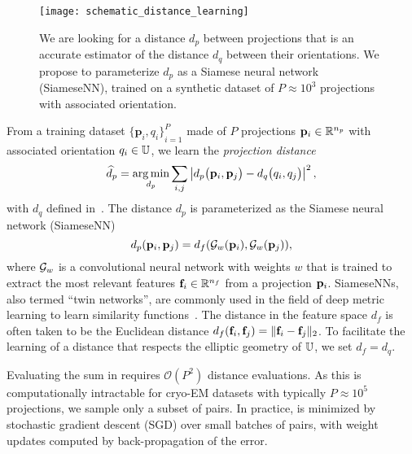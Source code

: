 \begin{figure}
    \centering
    \texttt{[image: schematic\_distance\_learning]}
    \caption{%
        We are looking for a distance $d_p$ between projections that is an accurate estimator of the distance $d_q$ between their orientations.
        We propose to parameterize $d_p$ as a Siamese neural network (SiameseNN), trained on a synthetic dataset of $P \approx 10^3$ projections with associated orientation.
}\label{fig:schematic:distance-learning}
\end{figure}

From a training dataset ${\{ \mathbf{p}_{i}, q_i \}}_{i=1}^{P}$ made of $P$ projections $\mathbf{p}_i \in \mathbb{R}^{n_p}$ with associated orientation $q_i \in \mathbb{U}$, we learn the \textit{projection distance}
\begin{equation}
    \widehat{d}_p = \operatorname*{arg\,min}_{d_p} \sum_{i,j} \left| d_p\big(\mathbf{p}_{i},\mathbf{p}_{j}\big) - d_q\big(q_i,q_j\big) \right|^2,
    \label{eqn:distance-learning}
\end{equation}
with $d_q$ defined in~.
The distance $d_p$ is parameterized as the Siamese neural network (SiameseNN)~\cite{chopra2005learning}
\begin{equation}
    d_p(\mathbf{p}_i, \mathbf{p}_j) = d_f(\mathcal{G}_w(\mathbf{p}_i), \mathcal{G}_w(\mathbf{p}_j)),
    \label{eqn:distance:projections}
\end{equation}
where $\mathcal{G}_w$ is a convolutional neural network with weights $w$ that is trained to extract the most relevant features $\mathbf{f}_i \in \mathbb{R}^{n_f}$ from a projection $\mathbf{p}_i$. SiameseNNs, also termed ``twin networks'', are commonly used in the field of deep metric learning to learn similarity functions~\cite{yi2014deep}.
The distance in the feature space $d_f$ is often taken to be the Euclidean distance $d_f(\mathbf{f}_i, \mathbf{f}_j) = \Vert \mathbf{f}_i - \mathbf{f}_j \Vert_2$.
To facilitate the learning of a distance that respects the elliptic geometry of $\mathbb{U}$, we set $d_f = d_q$.

Evaluating the sum in  requires $\mathcal{O}(P^2)$ distance evaluations.
As this is computationally intractable for cryo-EM datasets with typically $P \approx 10^5$ projections, we sample only a subset of pairs.
In practice,  is minimized by stochastic gradient descent (SGD) over small batches of pairs, with weight updates computed by back-propagation of the error.

